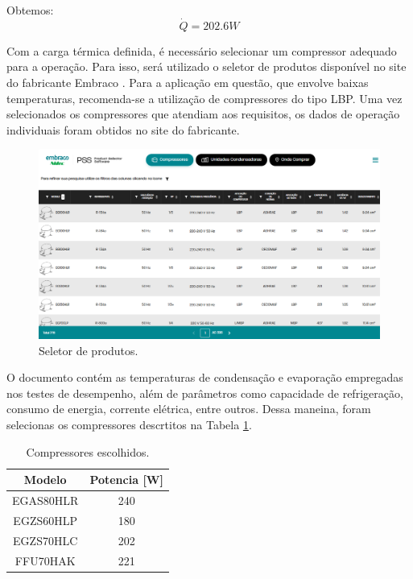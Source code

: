 Obtemos:
\begin{equation}
    \dot{Q} = 202.6 W
    \label{carga}
\end{equation}

Com a carga térmica definida, é necessário selecionar um compressor adequado para a operação. Para isso, será utilizado o seletor de produtos disponível no site do fabricante Embraco \textcopyright. Para a aplicação em questão, que envolve baixas temperaturas, recomenda-se a utilização de compressores do tipo LBP. Uma vez selecionados os compressores que atendiam aos requisitos, os dados de operação individuais foram obtidos no site do fabricante.

\begin{figure}
    \centering
    \includegraphics[width=0.8\linewidth]{Imagens/Desenvolvimento/PSS-embraco.png}
    \caption{Seletor de produtos.}
    \label{fig:seletor de produtos}
\end{figure}

\newpage

O documento contém as temperaturas de condensação e evaporação empregadas nos testes de desempenho, além de parâmetros como capacidade de refrigeração, consumo de energia, corrente elétrica, entre outros. Dessa maneina, foram selecionas os compressores descrtitos na Tabela \ref{tab:compressores escolhidos}.


\begin{table}[h]
\centering
\begin{tabular}{|c|c|}
\hline
Modelo    & Potencia {[}W{]} \\ \hline
EGAS80HLR & 240              \\ \hline
EGZS60HLP & 180              \\ \hline
EGZS70HLC & 202              \\ \hline
FFU70HAK  & 221              \\ \hline
\end{tabular}
\caption{Compressores escolhidos.}
\label{tab:compressores escolhidos}
\end{table}

